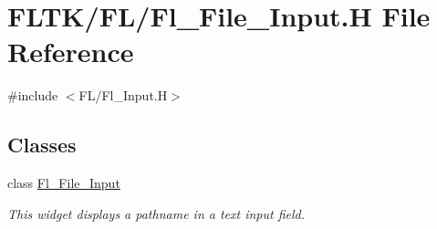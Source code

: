 \hypertarget{_fl___file___input_8_h}{}\section{F\+L\+T\+K/\+F\+L/\+Fl\+\_\+\+File\+\_\+\+Input.H File Reference}
\label{_fl___file___input_8_h}
{\ttfamily \#include $<$F\+L/\+Fl\+\_\+\+Input.\+H$>$}\newline
\subsection*{Classes}
\begin{DoxyCompactItemize}
\item 
class \hyperlink{class_fl___file___input}{Fl\+\_\+\+File\+\_\+\+Input}
\begin{DoxyCompactList}\small\item\em This widget displays a pathname in a text input field. \end{DoxyCompactList}\end{DoxyCompactItemize}
